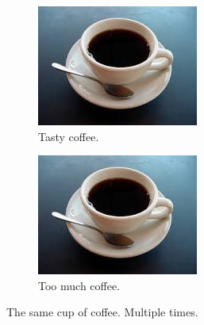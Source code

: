 \begin{figure}[h!]
\begin{subfigure}[b]{0.2\linewidth}
  \end{subfigure}
  \begin{subfigure}[b]{0.2\linewidth}
    \includegraphics[width=\linewidth]{figures/coffee.jpg}
    \caption{Tasty coffee.}
  \end{subfigure}
  \begin{subfigure}[b]{0.5\linewidth}
    \includegraphics[width=\linewidth]{figures/coffee.jpg}
    \caption{Too much coffee.}
  \end{subfigure}
  \caption{The same cup of coffee. Multiple times.}
  \label{fig:coffee3}
\end{figure}

% 